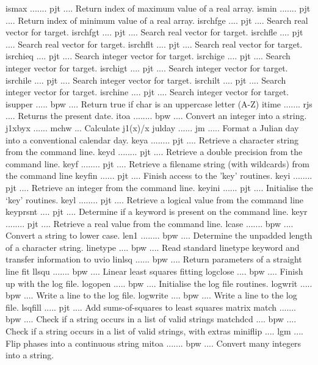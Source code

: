{\eightpoint\begintt
ismax ....... pjt .... Return index of maximum value of a real array. 
ismin ....... pjt .... Return index of minimum value of a real array. 
isrchfge .... pjt .... Search real vector for target. 
isrchfgt .... pjt .... Search real vector for target. 
isrchfle .... pjt .... Search real vector for target. 
\endtt}
{\eightpoint\begintt
isrchflt .... pjt .... Search real vector for target. 
isrchieq .... pjt .... Search integer vector for target. 
isrchige .... pjt .... Search integer vector for target. 
isrchigt .... pjt .... Search integer vector for target. 
isrchile .... pjt .... Search integer vector for target. 
\endtt}
{\eightpoint\begintt
isrchilt .... pjt .... Search integer vector for target. 
isrchine .... pjt .... Search integer vector for target. 
isupper ..... bpw .... Return true if char is an uppercase letter (A-Z) 
itime ....... rjs .... Returns the present date. 
itoa ........ bpw .... Convert an integer into a string. 
\endtt}
{\eightpoint\begintt
j1xbyx ...... mchw ... Calculate j1(x)/x 
julday ...... jm ..... Format a Julian day into a conventional calendar day. 
keya ........ pjt .... Retrieve a character string from the command line. 
keyd ........ pjt .... Retrieve a double precision from the command line. 
keyf ........ pjt .... Retrieve a filename string (with wildcards) from the command line 
\endtt}
{\eightpoint\begintt
keyfin ...... pjt .... Finish access to the 'key' routines. 
keyi ........ pjt .... Retrieve an integer from the command line. 
keyini ...... pjt .... Initialise the `key' routines. 
keyl ........ pjt .... Retrieve a logical value from the command line 
keyprsnt .... pjt .... Determine if a keyword is present on the command line. 
\endtt}
{\eightpoint\begintt
keyr ........ pjt .... Retrieve a real value from the command line. 
lcase ....... bpw .... Convert a string to lower case. 
len1 ........ bpw .... Determine the unpadded length of a character string. 
linetype .... bpw .... Read standard linetype keyword and transfer information to uvio 
linlsq ...... bpw .... Return parameters of a straight line fit 
\endtt}
{\eightpoint\begintt
llsqu ....... bpw .... Linear least squares fitting 
logclose .... bpw .... Finish up with the log file. 
logopen ..... bpw .... Initialise the log file routines. 
logwrit ..... bpw .... Write a line to the log file. 
logwrite .... bpw .... Write a line to the log file. 
\endtt}
{\eightpoint\begintt
lsqfill ..... pjt .... Add sums-of-squares to least squares matrix 
match ....... bpw .... Check if a string occurs in a list of valid strings 
matchdcd .... bpw .... Check if a string occurs in a list of valid strings, with extras 
miniflip .... lgm .... Flip phases into a continuous string 
mitoa ....... bpw .... Convert many integers into a string. 
\endtt}
